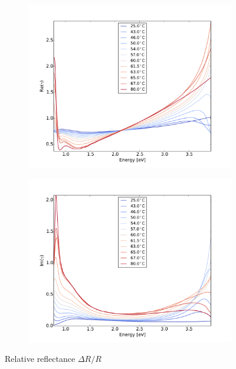 \begin{figure}
    \begin{subfigure}[b]{0.49\textwidth}
        \centering
        \includegraphics[width=\textwidth]{Results/Sim3/re_gamma.pdf}
        \caption{}
        \label{fig:2}
    \end{subfigure}
    \begin{subfigure}[b]{0.49\textwidth}
        \centering
        \includegraphics[width=\textwidth]{Results/Sim3/im_gamma.pdf}
        \caption{}
        \label{fig:2}
    \end{subfigure}
    \caption{Relative reflectance $\Delta R/R$}
    \label{fig:}
\end{figure}
